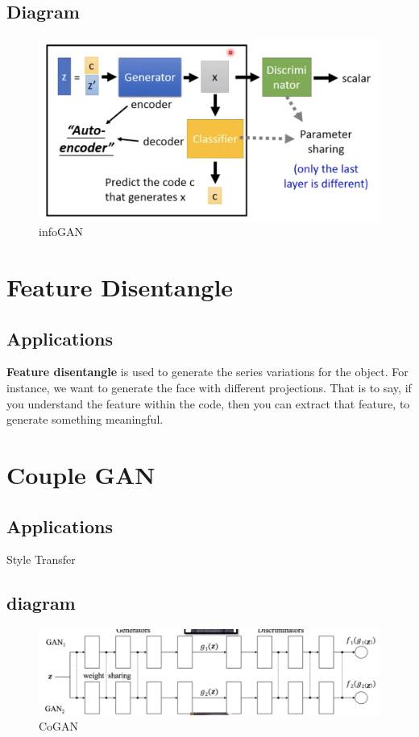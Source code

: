 \documentclass{article}
\begin{document}
\subsection{Diagram}
\begin{figure}
    \centering
    \includegraphics[width=\linewidth]{infoGAN}
    \caption{infoGAN}
\end{figure}
\section{Feature Disentangle}
\subsection{Applications}
\textbf{Feature disentangle} is used to generate the series variations for the object. For instance, we want to generate the face with different projections. That is to say, if you understand the feature within the code, then you can extract that feature, to generate something meaningful.
\section{Couple GAN}
\subsection{Applications}
Style Transfer
\subsection{diagram}
\begin{figure}[H]
    \centering
    \includegraphics[width=\linewidth]{coGAN}
    \caption{CoGAN}
\end{figure}
\end{document}
